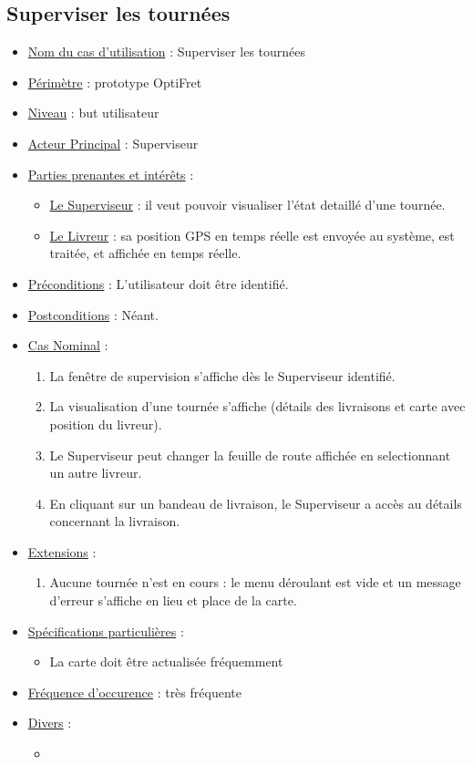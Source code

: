 \documentclass[a4paper]{report}
\begin{document}
\subsection{Superviser les tournées}
\begin{itemize}[label = \textbullet, font = \color{orange}]
\item \underline{Nom du cas d'utilisation} : Superviser les tournées
\item \underline{Périmètre} : prototype OptiFret
\item \underline{Niveau} : but utilisateur
\item \underline{Acteur Principal} : Superviseur
\item \underline{Parties prenantes et intérêts} :
	\begin{itemize}[label = \textbullet, font = \color{blue}]
    \item \underline{Le Superviseur} : il veut pouvoir visualiser l'état detaillé d'une tournée.
    \item \underline{Le Livreur} : sa position GPS en temps réelle est envoyée au système, est traitée, et affichée en temps réelle.
    \end{itemize}
\item \underline{Préconditions} : L'utilisateur doit être identifié.
\item \underline{Postconditions} : Néant.
\item \underline{Cas Nominal} : 
	\begin{enumerate}
        \item La fenêtre de supervision s'affiche dès le Superviseur identifié.
        \item La visualisation d'une tournée s'affiche (détails des livraisons et carte avec position du livreur).
        \item Le Superviseur peut changer la feuille de route affichée en selectionnant un autre livreur.
        \item En cliquant sur un bandeau de livraison, le Superviseur a accès au détails concernant la livraison.
    \end{enumerate}
\item \underline{Extensions} :
	\begin{enumerate}
    	\item Aucune tournée n'est en cours : le menu déroulant est vide et un message d'erreur s'affiche en lieu et place de la carte.
        
    \end{enumerate}
\item \underline{Spécifications particulières} :
	\begin{itemize}[label = \textbullet, font = \color{blue}]
    \item La carte doit être actualisée fréquemment
    \end{itemize}
\item \underline{Fréquence d'occurence} : très fréquente
\item \underline{Divers} :
	\begin{itemize}[label = \textbullet, font = \color{blue}]
    \item
    \end{itemize}
\end{itemize}
\end{document}

